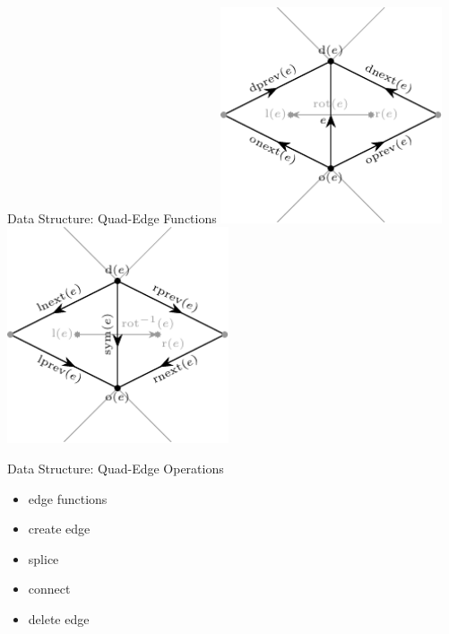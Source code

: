 \documentclass[aspectratio=169,fleqn]{beamer}
\begin{document}
  \begin{frame}{Data Structure: Quad-Edge Functions}
    \center
    \includegraphics[width=0.49\textwidth]{figures/quad-edge-vertex-functions.pdf}
    \hfill
    \includegraphics[width=0.49\textwidth]{figures/quad-edge-face-functions.pdf}
  \end{frame}

  \begin{frame}{Data Structure: Quad-Edge Operations}
    \begin{itemize}
      \item edge functions
      \item create edge
      \item splice
      \item connect
      \item delete edge
    \end{itemize}
  \end{frame}
\end{document}
